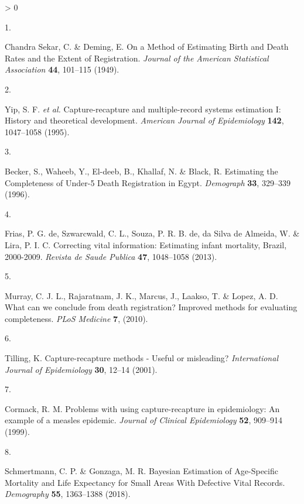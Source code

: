 \documentclass[
]{article}
\newlength{\cslhangindent}
\newlength{\csllabelwidth}
\newenvironment{CSLReferences}[2] %
 {%
  \setlength{\parindent}{0pt}
  \ifodd #1 \everypar{\setlength{\hangindent}{\cslhangindent}}\ignorespaces\fi
  \ifnum #2 > 0
  \setlength{\parskip}{#2\baselineskip}
  \fi
 }%
 {}
\newcommand{\CSLLeftMargin}[1]{\parbox[t]{\csllabelwidth}{#1}}
\newcommand{\CSLRightInline}[1]{\parbox[t]{\linewidth - \csllabelwidth}{#1}\break}
\begin{document}
\hypertarget{refs}{}
\begin{CSLReferences}{0}{0}
\leavevmode\hypertarget{ref-ChandraSekar1949}{}%
\CSLLeftMargin{1. }
\CSLRightInline{Chandra Sekar, C. \& Deming, E. {On a Method of Estimating Birth and Death Rates and the Extent of Registration}. \emph{Journal of the American Statistical Association} \textbf{44}, 101--115 (1949).}

\leavevmode\hypertarget{ref-Yip1995}{}%
\CSLLeftMargin{2. }
\CSLRightInline{Yip, S. F. \emph{et al.} {Capture-recapture and multiple-record systems estimation I: History and theoretical development}. \emph{American Journal of Epidemiology} \textbf{142}, 1047--1058 (1995).}

\leavevmode\hypertarget{ref-Becker1996}{}%
\CSLLeftMargin{3. }
\CSLRightInline{Becker, S., Waheeb, Y., El-deeb, B., Khallaf, N. \& Black, R. {Estimating the Completeness of Under-5 Death Registration in Egypt}. \emph{Demograph} \textbf{33}, 329--339 (1996).}

\leavevmode\hypertarget{ref-DeFrias2013}{}%
\CSLLeftMargin{4. }
\CSLRightInline{Frias, P. G. de, Szwarcwald, C. L., Souza, P. R. B. de, da Silva de Almeida, W. \& Lira, P. I. C. {Correcting vital information: Estimating infant mortality, Brazil, 2000-2009}. \emph{Revista de Saude Publica} \textbf{47}, 1048--1058 (2013).}

\leavevmode\hypertarget{ref-Murray2010}{}%
\CSLLeftMargin{5. }
\CSLRightInline{Murray, C. J. L., Rajaratnam, J. K., Marcus, J., Laakso, T. \& Lopez, A. D. {What can we conclude from death registration? Improved methods for evaluating completeness}. \emph{PLoS Medicine} \textbf{7}, (2010).}

\leavevmode\hypertarget{ref-Tilling2001}{}%
\CSLLeftMargin{6. }
\CSLRightInline{Tilling, K. {Capture-recapture methods - Useful or misleading?} \emph{International Journal of Epidemiology} \textbf{30}, 12--14 (2001).}

\leavevmode\hypertarget{ref-Cormack1999}{}%
\CSLLeftMargin{7. }
\CSLRightInline{Cormack, R. M. {Problems with using capture-recapture in epidemiology: An example of a measles epidemic}. \emph{Journal of Clinical Epidemiology} \textbf{52}, 909--914 (1999).}

\leavevmode\hypertarget{ref-Schmertmann2018a}{}%
\CSLLeftMargin{8. }
\CSLRightInline{Schmertmann, C. P. \& Gonzaga, M. R. {Bayesian Estimation of Age-Specific Mortality and Life Expectancy for Small Areas With Defective Vital Records}. \emph{Demography} \textbf{55}, 1363--1388 (2018).}


\end{CSLReferences}
\end{document}
